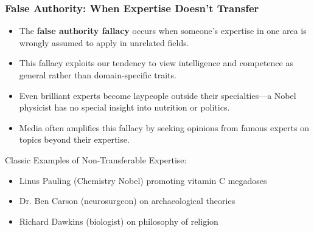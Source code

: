 \documentclass{beamer}
\begin{document}
	\begin{frame}
		\frametitle{False Authority: When Expertise Doesn't Transfer}
		\begin{itemize}
			\item The \textbf{false authority fallacy} occurs when someone's expertise in one area is wrongly assumed to apply in unrelated fields.
			\item This fallacy exploits our tendency to view intelligence and competence as general rather than domain-specific traits.
			\item Even brilliant experts become laypeople outside their specialties—a Nobel physicist has no special insight into nutrition or politics.
			\item Media often amplifies this fallacy by seeking opinions from famous experts on topics beyond their expertise.
		\end{itemize}
		
		\begin{example}
			Classic Examples of Non-Transferable Expertise:
			\begin{itemize}
				\item Linus Pauling (Chemistry Nobel) promoting vitamin C megadoses
				\item Dr. Ben Carson (neurosurgeon) on archaeological theories
				\item Richard Dawkins (biologist) on philosophy of religion
			\end{itemize}
		\end{example}
	\end{frame}
	
\end{document}

